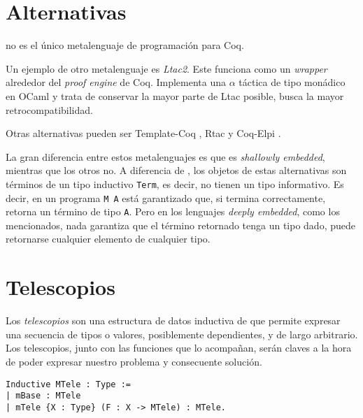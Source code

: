 \section{Alternativas}

\Mtac no es el único metalenguaje de programación para Coq. 

Un ejemplo de otro metalenguaje es \emph{Ltac2}.
Este funciona como un \emph{wrapper} alrededor del \emph{proof engine} de Coq.
Implementa una $\alpha$ táctica de tipo monádico en OCaml y trata de conservar la mayor parte de Ltac posible, busca la mayor retrocompatibilidad.

Otras alternativas pueden ser Template-Coq \cite{DBLP:conf/itp/AnandBCST18}, Rtac \cite{DBLP:conf/esop/MalechaB16} y Coq-Elpi \cite{tassi:hal-01637063}.

La gran diferencia entre estos metalenguajes es que \Mtac es \emph{shallowly embedded}, mientras que los otros no. A diferencia de \Mtac, los objetos de estas alternativas son términos de un tipo inductivo \lstinline{Term}, es decir, no tienen un tipo informativo. Es decir, en \Mtac un programa \lstinline{M A} está garantizado que, si termina correctamente, retorna un término de tipo \lstinline{A}. Pero en los lenguajes \emph{deeply embedded}, como los mencionados, nada garantiza que el término retornado tenga un tipo dado, puede retornarse cualquier elemento de cualquier tipo.

\section{Telescopios}

Los \emph{telescopios} son una estructura de datos inductiva de \Mtac que permite expresar una secuencia de tipos o valores, posiblemente dependientes, y de largo arbitrario.
Los telescopios, junto con las funciones que lo acompañan, serán claves a la hora de poder expresar nuestro problema y consecuente solución.

\begin{lstlisting}[frame=tb,caption={Definicion de telescopio},label=lst:MTele]
Inductive MTele : Type :=
| mBase : MTele
| mTele {X : Type} (F : X -> MTele) : MTele.
\end{lstlisting}

